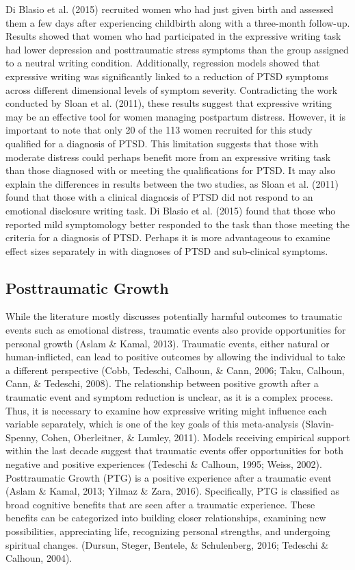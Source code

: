 \documentclass[english,man, mask]{apa6}
\theoremstyle{definition}
\theoremstyle{definition}
\theoremstyle{definition}
\theoremstyle{remark}
\begin{document}
Di Blasio et al. (2015) recruited women who had just given birth and
assessed them a few days after experiencing childbirth along with a
three-month follow-up. Results showed that women who had participated in
the expressive writing task had lower depression and posttraumatic
stress symptoms than the group assigned to a neutral writing condition.
Additionally, regression models showed that expressive writing was
significantly linked to a reduction of PTSD symptoms across different
dimensional levels of symptom severity. Contradicting the work conducted
by Sloan et al. (2011), these results suggest that expressive writing
may be an effective tool for women managing postpartum distress.
However, it is important to note that only 20 of the 113 women recruited
for this study qualified for a diagnosis of PTSD. This limitation
suggests that those with moderate distress could perhaps benefit more
from an expressive writing task than those diagnosed with or meeting the
qualifications for PTSD. It may also explain the differences in results
between the two studies, as Sloan et al. (2011) found that those with a
clinical diagnosis of PTSD did not respond to an emotional disclosure
writing task. Di Blasio et al. (2015) found that those who reported mild
symptomology better responded to the task than those meeting the
criteria for a diagnosis of PTSD. Perhaps it is more advantageous to
examine effect sizes separately in with diagnoses of PTSD and
sub-clinical symptoms.

\subsection{Posttraumatic Growth}\label{posttraumatic-growth}

While the literature mostly discusses potentially harmful outcomes to
traumatic events such as emotional distress, traumatic events also
provide opportunities for personal growth (Aslam \& Kamal, 2013).
Traumatic events, either natural or human-inflicted, can lead to
positive outcomes by allowing the individual to take a different
perspective (Cobb, Tedeschi, Calhoun, \& Cann, 2006; Taku, Calhoun,
Cann, \& Tedeschi, 2008). The relationship between positive growth after
a traumatic event and symptom reduction is unclear, as it is a complex
process. Thus, it is necessary to examine how expressive writing might
influence each variable separately, which is one of the key goals of
this meta-analysis (Slavin-Spenny, Cohen, Oberleitner, \& Lumley, 2011).
Models receiving empirical support within the last decade suggest that
traumatic events offer opportunities for both negative and positive
experiences (Tedeschi \& Calhoun, 1995; Weiss, 2002). Posttraumatic
Growth (PTG) is a positive experience after a traumatic event (Aslam \&
Kamal, 2013; Yilmaz \& Zara, 2016). Specifically, PTG is classified as
broad cognitive benefits that are seen after a traumatic experience.
These benefits can be categorized into building closer relationships,
examining new possibilities, appreciating life, recognizing personal
strengths, and undergoing spiritual changes. (Dursun, Steger, Bentele,
\& Schulenberg, 2016; Tedeschi \& Calhoun, 2004).
\end{document}
